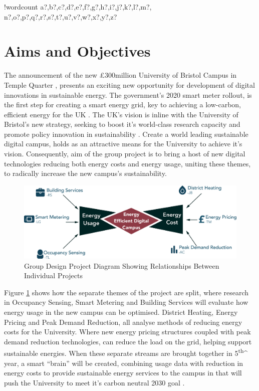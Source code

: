 \documentclass[10pt]{article}
\newcounter{words}
\newenvironment{counted}{%
  \setcounter{words}{0}
  \SearchList!{wordcount}{\stepcounter{words}}
    {a?,b?,c?,d?,e?,f?,g?,h?,i?,j?,k?,l?,m?,
    n?,o?,p?,q?,r?,s?,t?,u?,v?,w?,x?,y?,z?}
  \UndoBoundary{'}
  \SearchOrder{p;}}{%
  \StopSearching}
\begin{document}
\clearpage
{}
\begin{counted} %
\section{Aims and Objectives}\label{aims-and-objectives}

The announcement of the new £300million University of Bristol Campus in
Temple Quarter \cite{November58:online}, presents an exciting new
opportunity for development of digital innovations in sustainable
energy. The government's 2020 smart meter rollout, is the first step for
creating a smart energy grid, key to achieving a low-carbon, efficient
energy for the UK \cite{SmartEne79:online}. The UK's vision is inline
with the University of Bristol's new strategy, seeking to boost it's
world-class research capacity and promote policy innovation in
sustainability \cite{universi93:online}. Create a world leading
sustainable digital campus, holds as an attractive means for the
University to achieve it's vision. Consequently, aim of the group
project is to bring a host of new digital technologies reducing both
energy costs and energy usage, uniting these themes, to radically
increase the new campus's sustainability.

\begin{figure}[H]
\centering
\includegraphics[width=1\textwidth]{groupDia}
\caption{Group Design Project Diagram Showing Relationships Between Individual Projects}
\label{groupDia}
\end{figure}

Figure \ref{groupDia} shows how the separate themes of the project are
split, where research in Occupancy Sensing, Smart Metering and Building
Services will evaluate how energy usage in the new campus can be
optimised. District Heating, Energy Pricing and Peak Demand Reduction,
all analyse methods of reducing energy costs for the University. Where
new energy pricing structures coupled with peak demand reduction
technologies, can reduce the load on the grid, helping support
sustainable energies. When these separate streams are brought together
in 5\textsuperscript{th}\^{} year, a smart ``brain'' will be created,
combining usage data with reduction in energy costs to provide
sustainable energy services to the campus in that will push the
University to meet it's carbon neutral 2030 goal
\cite{universi93:online}.


\end{counted}
\end{document}
